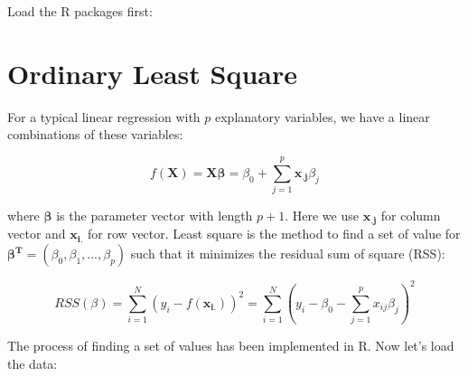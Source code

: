 \documentclass[12pt,]{krantz}
\makeatletter
\newenvironment{Shaded}{\begin{snugshade}}{\end{snugshade}}
\newcommand{\CommentTok}[1]{\textcolor[rgb]{0.37,0.37,0.37}{\textit{#1}}}
\newcommand{\ControlFlowTok}[1]{\textcolor[rgb]{0.27,0.27,0.27}{\textbf{#1}}}
\newcommand{\DataTypeTok}[1]{\textcolor[rgb]{0.27,0.27,0.27}{#1}}
\newcommand{\DecValTok}[1]{\textcolor[rgb]{0.06,0.06,0.06}{#1}}
\newcommand{\KeywordTok}[1]{\textcolor[rgb]{0.27,0.27,0.27}{\textbf{#1}}}
\newcommand{\NormalTok}[1]{#1}
\newcommand{\OperatorTok}[1]{\textcolor[rgb]{0.43,0.43,0.43}{\textbf{#1}}}
\newcommand{\OtherTok}[1]{\textcolor[rgb]{0.37,0.37,0.37}{#1}}
\newcommand{\StringTok}[1]{\textcolor[rgb]{0.5,0.5,0.5}{#1}}
\newenvironment{kframe}{%
\medskip{}
\setlength{\fboxsep}{.8em}
 \def\at@end@of@kframe{}%
 \ifinner\ifhmode%
  \def\at@end@of@kframe{\end{minipage}}%
  \begin{minipage}{\columnwidth}%
 \fi\fi%
 \def\FrameCommand##1{\hskip\@totalleftmargin \hskip-\fboxsep
 \colorbox{shadecolor}{##1}\hskip-\fboxsep
     \hskip-\linewidth \hskip-\@totalleftmargin \hskip\columnwidth}%
 \MakeFramed {\advance\hsize-\width
   \@totalleftmargin\z@ \linewidth\hsize
   \@setminipage}}%
 {\par\unskip\endMakeFramed%
 \at@end@of@kframe}
\renewenvironment{Shaded}{\begin{kframe}}{\end{kframe}}
\makeatother
\begin{document}
Load the R packages first:

\begin{Shaded}
\end{Shaded}

\hypertarget{ordinary-least-square}{%
\section{Ordinary Least Square}\label{ordinary-least-square}}

For a typical linear regression with \(p\) explanatory variables, we have a linear combinations of these variables:

\[f(\mathbf{X})=\mathbf{X}\symbf{\beta}=\beta_{0}+\sum_{j=1}^{p}\mathbf{x_{.j}}\beta_{j}\]

where \(\symbf{\beta}\) is the parameter vector with length \(p+1\). Here we use \(\mathbf{x_{.j}}\) for column vector and \(\mathbf{x_{i.}}\) for row vector. Least square is the method to find a set of value for \(\symbf{\beta^{T}}=(\beta_{0},\beta_{1},...,\beta_{p})\) such that it minimizes the residual sum of square (RSS):

\[RSS(\beta)=\sum_{i=1}^{N}(y_{i}-f(\mathbf{x_{i.}}))^{2}=\sum_{i=1}^{N}(y_{i}-\beta_{0}-\sum_{j=1}^{p}x_{ij}\beta_{j})^{2}\]

The process of finding a set of values has been implemented in R. Now let's load the data:
\end{document}
